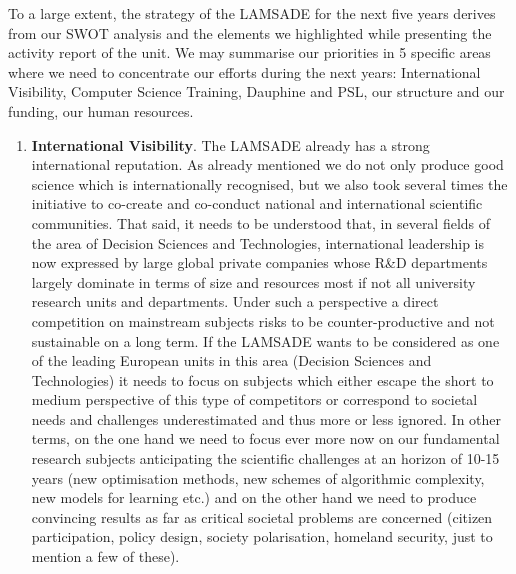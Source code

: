 To a large extent, the strategy of the LAMSADE for the next five years derives from our SWOT analysis and the elements we highlighted while presenting the activity report of the unit. We may summarise our priorities in 5 specific areas where we need to concentrate our efforts during the next years: International Visibility, Computer Science Training, Dauphine and PSL, our structure and our funding, our human resources.

\begin{enumerate}
  \item \textbf{International Visibility}. The LAMSADE already has a strong international reputation. As already mentioned we do not only produce good science which is internationally recognised, but we also took several times the initiative to co-create and co-conduct national and international scientific communities. That said, it needs to be understood that, in several fields of the area of Decision Sciences and Technologies, international leadership is now expressed by large global private companies whose R\&D departments largely dominate in terms of size and resources most if not all university research units and departments. Under such a perspective a direct competition on mainstream subjects risks to be counter-productive and not sustainable on a long term. If the LAMSADE wants to be considered as one of the leading European units in this area (Decision Sciences and Technologies) it needs to focus on subjects which either escape the short to medium perspective of this type of competitors or correspond to societal needs and challenges underestimated and thus more or less ignored. In other terms, on the one hand we need to focus ever more now on our fundamental research subjects anticipating the scientific challenges at an horizon of 10-15 years (new optimisation methods, new schemes of algorithmic complexity, new models for learning etc.) and on the other hand we need to produce convincing results as far as critical societal problems are concerned (citizen participation, policy design, society polarisation, homeland security, just to mention a few of these).


\end{enumerate}
